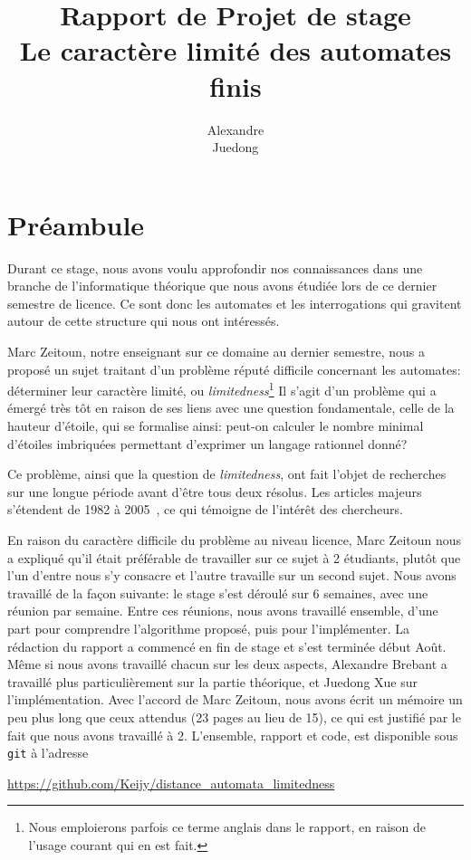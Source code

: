 \documentclass[12pt]{memoir}
\title{\textbf{Rapport de Projet de stage\\[20ex] Le caractère limité des
    automates finis}}
\author{
\bsc {Brebant} Alexandre\\
\bsc {Xue} Juedong}
\begin{document}
\maketitle

\newcommand{\Aut}{\mathcal{A}}
\newcommand{\Ref}{\Aut_{ref}}
\newcommand{\N}{\mathbb{N}}
\newcommand{\R}{\mathcal{R}}

\newpage

\section*{Préambule}


Durant ce stage, nous avons voulu approfondir nos connaissances dans une
branche de l'informatique théorique que nous avons étudiée lors de
ce dernier semestre de licence. Ce sont donc les automates et les
interrogations qui gravitent autour de cette structure qui nous ont
intéressés.

\medskip Marc Zeitoun, notre enseignant sur ce domaine au dernier semestre,
nous a proposé un sujet traitant d'un problème réputé difficile concernant les
automates: déterminer leur caractère limité, ou \emph{limitedness}\footnote{Nous
  emploierons parfois ce terme anglais dans le rapport, en raison de l'usage
  courant qui en est fait.}  Il s'agit d'un problème qui a émergé très tôt
en raison de ses liens avec une question fondamentale, celle de la hauteur
d'étoile, qui se formalise ainsi: peut-on calculer le nombre minimal d'étoiles
imbriquées permettant d'exprimer un langage rationnel donné?

Ce problème, ainsi que la question de \emph{limitedness}, ont fait l'objet
de recherches sur une longue période avant d'être tous deux résolus. Les
articles majeurs s'étendent de 1982 à
2005~\cite{Hashiguchi:Limitedness-theorem-on-finite-automata-with-distance-functions:1982:a,Simon:Factorization-forests-finite-height:1990:a,Simon:Semigroups-Matrices-over-Tropical:1994:a,Kirsten:Distance-desert-automata-star:2005:a},
ce qui témoigne de l'intérêt des chercheurs.

\medskip
En raison du caractère difficile du problème au niveau licence, Marc Zeitoun
nous a expliqué qu'il était préférable de travailler sur ce sujet à 2
étudiants, plutôt que l'un d'entre nous s'y consacre et l'autre travaille sur
un second sujet. Nous avons travaillé de la façon suivante: le stage s'est
déroulé sur 6 semaines, avec une réunion par semaine. Entre ces réunions, nous avons travaillé ensemble, d'une part pour
comprendre l'algorithme proposé, puis pour l'implémenter. La rédaction du
rapport a commencé en fin de stage et s'est terminée début Août. Même si nous
avons travaillé chacun sur les deux aspects, Alexandre Brebant a travaillé
plus particulièrement sur la partie théorique, et Juedong Xue sur
l'implémentation. Avec l'accord de Marc Zeitoun, nous avons écrit un mémoire
un peu plus long que ceux attendus (23 pages au lieu de 15), ce qui est
justifié par le fait que nous avons travaillé à 2.
L'ensemble, rapport et code, est disponible sous \texttt{git} à l'adresse
\begin{center}
  \url{https://github.com/Keijy/distance_automata_limitedness}
\end{center}
\end{document}
